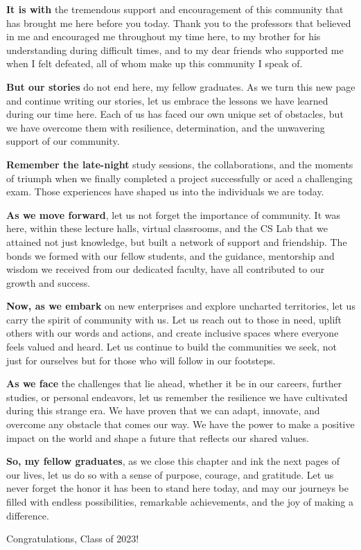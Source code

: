 \documentclass[12pt]{article}
\begin{document}
\textbf{It is with} the tremendous support and encouragement of this community
that has brought me here before you today.  Thank you to the professors that
believed in me and encouraged me throughout my time here, to my brother for his understanding
during difficult times, and to my dear friends who supported me when I felt
defeated, all of whom make up this community I speak of.

\textbf{But our stories} do not end here, my fellow graduates. As we turn this new page and continue
writing our stories, let us embrace the lessons we have learned during our time
here. Each of us has faced our own unique set of obstacles, but we have overcome them with
resilience, determination, and the unwavering support of our community. 

\textbf{Remember the late-night} study sessions, the collaborations, and the
moments of triumph when we finally completed a project successfully or aced a challenging exam.
Those experiences have shaped us into the individuals we are today. 

\textbf{As we move forward}, let us not forget the importance of community. It was
here, within these lecture halls, virtual classrooms, and the CS Lab
that we attained not just knowledge, but built a network of support and friendship. The
bonds we formed with our fellow students, and the guidance, mentorship and wisdom we
received from our dedicated faculty, have all contributed to our growth and success. 

\textbf{Now, as we embark} on new enterprises and explore uncharted territories, let us
carry the spirit of community with us. Let us reach out to those in need, uplift
others with our words and actions, and create inclusive spaces where everyone
feels valued and heard. Let us continue to build the communities we seek, not
just for ourselves but for those who will follow in our footsteps. 

\textbf{As we face} the challenges that lie ahead, whether it be in our careers, further
studies, or personal endeavors, let us remember the resilience we have
cultivated during this strange era. We have proven that we can adapt,
innovate, and overcome any obstacle that comes our way. We have the power to
make a positive impact on the world and shape a future that reflects our shared
values. 

\textbf{So, my fellow graduates}, as we close this chapter and ink the next pages
of our lives, let us do so with a sense of purpose, courage, and gratitude. Let
us never forget the honor it has been to stand here today, and may our journeys
be filled with endless possibilities, remarkable achievements, and the joy of
making a difference. 

Congratulations, Class of 2023!
\end{document}
